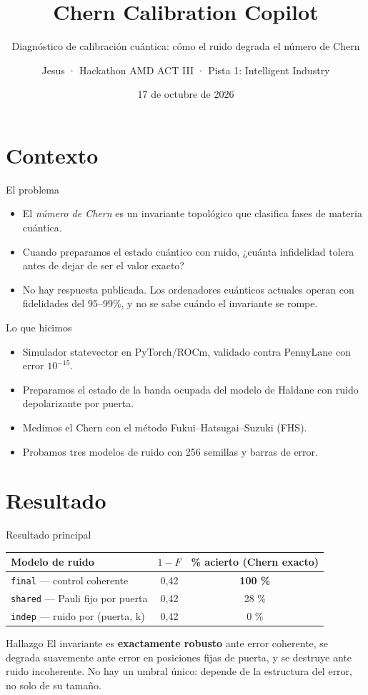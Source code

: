 \documentclass[10pt,aspectratio=169]{beamer}
\title{Chern Calibration Copilot}
\subtitle{Diagnóstico de calibración cuántica: cómo el ruido degrada el número de Chern}
\author{Jesus · Hackathon AMD ACT III · Pista 1: Intelligent Industry}
\institute{AMD Developer Hackathon ACT III — lablab.ai × AMD}
\date{17 de octubre de 2026}
\begin{document}
\frame{\titlepage}

\section{Contexto}
\begin{frame}{El problema}
\begin{itemize}
\item El \emph{número de Chern} es un invariante topológico que clasifica fases de materia cuántica.
\item Cuando preparamos el estado cuántico con ruido, ¿cuánta infidelidad tolera antes de dejar de ser el valor exacto?
\item No hay respuesta publicada. Los ordenadores cuánticos actuales operan con fidelidades del 95--99\%, y no se sabe cuándo el invariante se rompe.
\end{itemize}
\end{frame}

\begin{frame}{Lo que hicimos}
\begin{itemize}
\item Simulador statevector en PyTorch/ROCm, validado contra PennyLane con error $10^{-15}$.
\item Preparamos el estado de la banda ocupada del modelo de Haldane con ruido depolarizante por puerta.
\item Medimos el Chern con el método Fukui--Hatsugai--Suzuki (FHS).
\item Probamos tres modelos de ruido con 256 semillas y barras de error.
\end{itemize}
\end{frame}

\section{Resultado}
\begin{frame}{Resultado principal}
\begin{table}[!htbp]
\centering
\small
\begin{tabular}{lcc}
\toprule
Modelo de ruido & $1-F$ & \% acierto (Chern exacto) \\
\midrule
\texttt{final} --- control coherente & 0,42 & \textbf{100 \%} \\
\texttt{shared} --- Pauli fijo por puerta & 0,42 & 28 \% \\
\texttt{indep} --- ruido por (puerta, k) & 0,42 & 0 \% \\
\bottomrule
\end{tabular}
\end{table}
\vspace{0.5cm}
\begin{block}{Hallazgo}
El invariante es \textbf{exactamente robusto} ante error coherente, se degrada suavemente ante error en posiciones fijas de puerta, y se destruye ante ruido incoherente. No hay un umbral único: depende de la estructura del error, no solo de su tamaño.
\end{block}
\end{frame}
\end{document}
